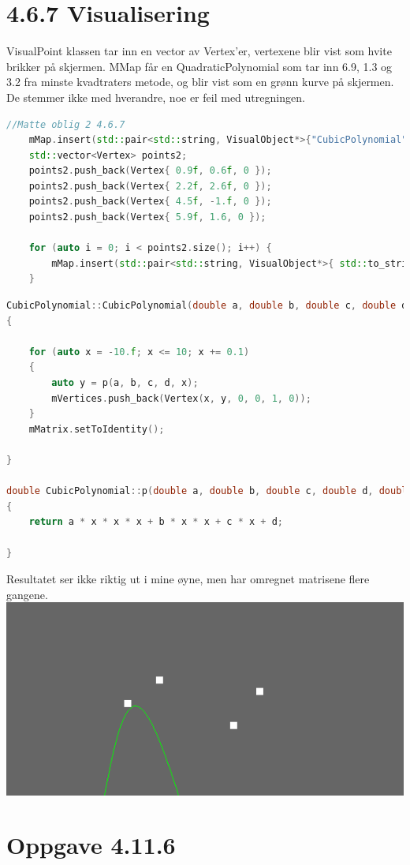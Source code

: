 \documentclass[a4paper,norsk]{article}
\begin{document}
\section{4.6.7 Visualisering}
VisualPoint klassen tar inn en vector av Vertex'er, vertexene blir vist som hvite brikker på skjermen. MMap får en QuadraticPolynomial som tar inn 6.9, 1.3 og 3.2 fra minste kvadtraters metode, og blir vist som en grønn kurve på skjermen.
De stemmer ikke med hverandre, noe er feil med utregningen.
\begin{lstlisting}[language=C++, caption={renderwindow.cpp}]
//Matte oblig 2 4.6.7
    mMap.insert(std::pair<std::string, VisualObject*>{"CubicPolynomial", new CubicPolynomial(-0.34, -3.586, 9.844, -5.634,0.1f)});
    std::vector<Vertex> points2;
    points2.push_back(Vertex{ 0.9f, 0.6f, 0 });
    points2.push_back(Vertex{ 2.2f, 2.6f, 0 });
    points2.push_back(Vertex{ 4.5f, -1.f, 0 });
    points2.push_back(Vertex{ 5.9f, 1.6, 0 });
    
    for (auto i = 0; i < points2.size(); i++) {
        mMap.insert(std::pair<std::string, VisualObject*>{ std::to_string(i*10), new VisualPoint(points2)});
    }
\end{lstlisting}
\begin{lstlisting}[language=C++, caption={cubicpolynomial.cpp}]
CubicPolynomial::CubicPolynomial(double a, double b, double c, double d, float dx)
{
   
    for (auto x = -10.f; x <= 10; x += 0.1)
    {
        auto y = p(a, b, c, d, x);
        mVertices.push_back(Vertex(x, y, 0, 0, 1, 0));
    }
    mMatrix.setToIdentity();

}

double CubicPolynomial::p(double a, double b, double c, double d, double x)
{
    return a * x * x * x + b * x * x + c * x + d;

}
\end{lstlisting}
Resultatet ser ikke riktig ut i mine øyne, men har omregnet matrisene flere gangene. 
\centering
\includegraphics[width=\textwidth]{MatteOblig2Kubiskinterpolasjon}

\section{Oppgave 4.11.6}
\end{document}
